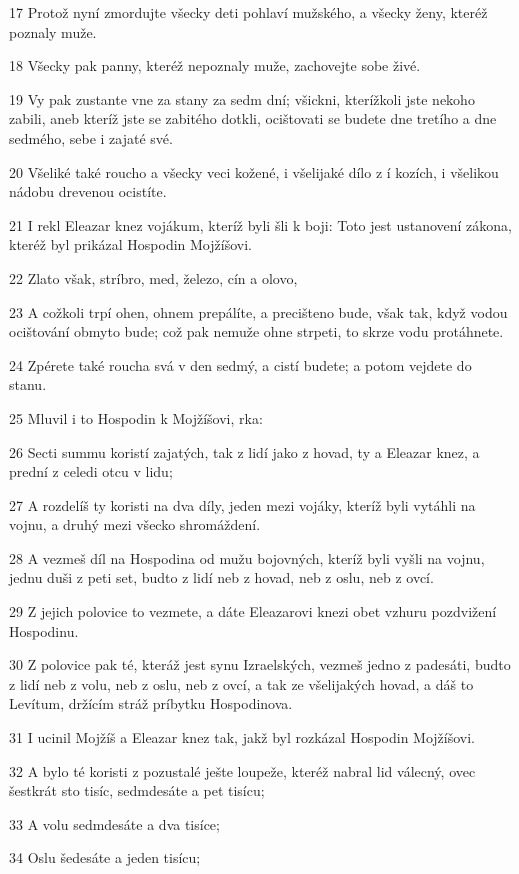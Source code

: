 \par 17 Protož nyní zmordujte všecky deti pohlaví mužského, a všecky ženy, kteréž poznaly muže.
\par 18 Všecky pak panny, kteréž nepoznaly muže, zachovejte sobe živé.
\par 19 Vy pak zustante vne za stany za sedm dní; všickni, kterížkoli jste nekoho zabili, aneb kteríž jste se zabitého dotkli, ocištovati se budete dne tretího a dne sedmého, sebe i zajaté své.
\par 20 Všeliké také roucho a všecky veci kožené, i všelijaké dílo z í kozích, i všelikou nádobu drevenou ocistíte.
\par 21 I rekl Eleazar knez vojákum, kteríž byli šli k boji: Toto jest ustanovení zákona, kteréž byl prikázal Hospodin Mojžíšovi.
\par 22 Zlato však, stríbro, med, železo, cín a olovo,
\par 23 A cožkoli trpí ohen, ohnem prepálíte, a precišteno bude, však tak, když vodou ocištování obmyto bude; což pak nemuže ohne strpeti, to skrze vodu protáhnete.
\par 24 Zpérete také roucha svá v den sedmý, a cistí budete; a potom vejdete do stanu.
\par 25 Mluvil i to Hospodin k Mojžíšovi, rka:
\par 26 Secti summu koristí zajatých, tak z lidí jako z hovad, ty a Eleazar knez, a prední z celedi otcu v lidu;
\par 27 A rozdelíš ty koristi na dva díly, jeden mezi vojáky, kteríž byli vytáhli na vojnu, a druhý mezi všecko shromáždení.
\par 28 A vezmeš díl na Hospodina od mužu bojovných, kteríž byli vyšli na vojnu, jednu duši z peti set, budto z lidí neb z hovad, neb z oslu, neb z ovcí.
\par 29 Z jejich polovice to vezmete, a dáte Eleazarovi knezi obet vzhuru pozdvižení Hospodinu.
\par 30 Z polovice pak té, kteráž jest synu Izraelských, vezmeš jedno z padesáti, budto z lidí neb z volu, neb z oslu, neb z ovcí, a tak ze všelijakých hovad, a dáš to Levítum, držícím stráž príbytku Hospodinova.
\par 31 I ucinil Mojžíš a Eleazar knez tak, jakž byl rozkázal Hospodin Mojžíšovi.
\par 32 A bylo té koristi z pozustalé ješte loupeže, kteréž nabral lid válecný, ovec šestkrát sto tisíc, sedmdesáte a pet tisícu;
\par 33 A volu sedmdesáte a dva tisíce;
\par 34 Oslu šedesáte a jeden tisícu;
